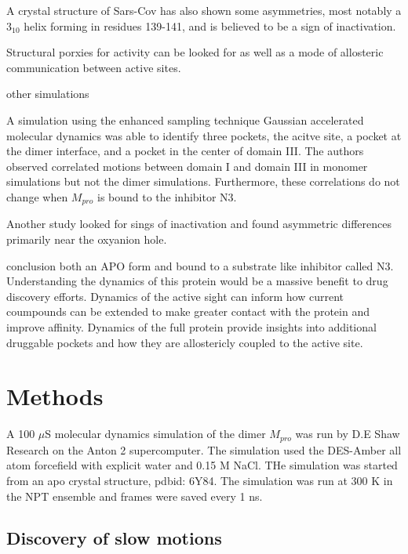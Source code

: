 \documentclass{biophys-new}
\begin{document}
A crystal structure of Sars-Cov has also shown some asymmetries, most notably a $3_{10}$ helix forming in residues 139-141, and is believed to be a sign of inactivation. \cite{yang2003crystal}

Structural porxies for activity can be looked for as well as a mode of allosteric communication between active sites.

other simulations

A simulation using the enhanced sampling technique Gaussian accelerated molecular dynamics was able to identify three pockets, the acitve site, a pocket at the dimer interface, and a pocket in the center of domain III. The authors observed correlated motions between domain I and domain III in monomer simulations but not the dimer simulations. Furthermore, these correlations do not change when $M_{pro}$ is bound to the inhibitor N3\cite{sztain2020elucidation}.

Another study looked for sings of inactivation and found asymmetric differences primarily near the oxyanion hole. \cite{inizan2021high}

conclusion
both an APO form and bound to a substrate like inhibitor called N3. Understanding the dynamics of this protein would be a massive benefit to drug discovery efforts. Dynamics of the active sight can inform how current coumpounds can be extended to make greater contact with the protein and improve affinity. Dynamics of the full protein provide insights into additional druggable pockets and how they are allostericly coupled to the active site.




\section*{Methods}

A 100 $\mu$S molecular dynamics simulation of the dimer $M_{pro}$ was run by D.E Shaw Research on the Anton 2 supercomputer.\cite{shaw2020molecular} The simulation used the DES-Amber all atom forcefield\cite{piana2020development} with explicit water and 0.15 M NaCl. THe simulation was started from an apo crystal structure, pdbid: 6Y84. The simulation was run at 300 K in the NPT ensemble and frames were saved every 1 ns.

\subsection*{Discovery of slow motions}
\end{document}
